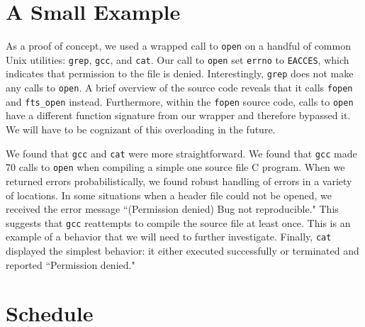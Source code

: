 \documentclass[10pt]{article}
\begin{document}
\section{A Small Example}
As a proof of concept, we used a wrapped call to \texttt{open} on a handful of common Unix utilities: \texttt{grep}, \texttt{gcc}, and \texttt{cat}. Our call to \texttt{open} set \texttt{errno} to \texttt{EACCES}, which indicates that permission to the file is denied. Interestingly, \texttt{grep} does not make any calls to \texttt{open}. A brief overview of the source code reveals that it calls \texttt{fopen} and \texttt{fts\_open} instead. Furthermore, within the \texttt{fopen} source code, calls to \texttt{open} have a different function signature from our wrapper and therefore bypassed it. We will have to be cognizant of this overloading in the future.

We found that \texttt{gcc} and \texttt{cat} were more straightforward. We found that \texttt{gcc} made 70 calls to \texttt{open} when compiling a simple one source file C program. When we returned errors probabilistically, we found robust handling of errors in a variety of locations. In some situations when a header file could not be opened, we received the error message ``(Permission denied) Bug not reproducible." This suggests that \texttt{gcc} reattempts to compile the source file at least once. This is an example of a behavior that we will need to further investigate. Finally, \texttt{cat} displayed the simplest behavior: it either executed successfully or terminated and reported ``Permission denied."


\section{Schedule}
\end{document}
